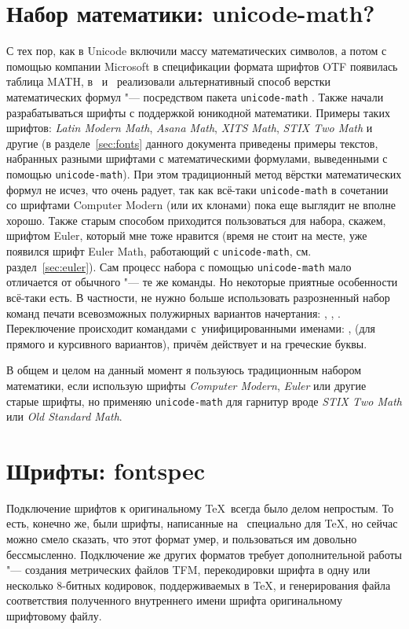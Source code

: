 \documentclass[a4paper,12pt,hyphens]{article}
\newcommand\package[1]{\texttt{#1}}
\newcommand\lcmd[1]{\texttt{#1}}
\begin{document}
\section{Набор математики: unicode-math?}
С тех пор, как в Unicode включили массу математических символов, а потом с
помощью компании Microsoft в спецификации формата шрифтов OTF
появилась таблица MATH, в \LuaLaTeX\ и \XeTeX\ реализовали альтернативный
способ верстки математических формул "--- посредством пакета
\package{unicode-math} \parencite{ctan-unicode-math}.
Также начали разрабатываться шрифты с поддержкой юникодной математики. Примеры таких
шрифтов: \emph{Latin Modern Math}, \emph{Asana Math}, \emph{XITS Math},
\emph{STIX Two Math} и другие (в разделе~\ref{sec:fonts} данного документа приведены
примеры текстов, набранных разными шрифтами с математическими формулами, выведенными
с помощью \package{unicode-math}).
При этом традиционный метод вёрстки математических формул не исчез, что
очень радует, так как всё-таки \package{unicode-math} в сочетании со шрифтами
Computer Modern (или их клонами) пока еще выглядит не вполне хорошо.
Также старым способом приходится пользоваться для набора, скажем, шрифтом
Euler, который мне тоже нравится (время не стоит на месте, уже появился шрифт Euler Math,
работающий с \package{unicode-math}, см. раздел~\ref{sec:euler}). Сам процесс набора с помощью \package{unicode-math}
мало отличается от обычного "--- те же команды. Но некоторые приятные особенности всё-таки
есть. В частности, не нужно больше использовать разрозненный набор команд
печати всевозможных полужирных вариантов начертания: \lcmd{\mathbf}, \lcmd{\boldkey},
\lcmd{\boldsymbol}. Переключение происходит командами с~унифицированными именами:
\lcmd{\symbfup}, \lcmd{\symbfit} (для прямого и курсивного вариантов), причём
действует и на греческие буквы.

В общем и целом на данный момент я пользуюсь традиционным набором математики,
если использую шрифты \emph{Computer Modern}, \emph{Euler} или другие старые шрифты, но
применяю \package{unicode-math} для гарнитур вроде \emph{STIX Two Math} или
\emph{Old Standard Math}.

\section{Шрифты: fontspec}
Подключение шрифтов к оригинальному \TeX\ всегда было делом непростым.
То есть, конечно же, были шрифты, написанные на \METAFONT\ специально для
\TeX, но сейчас можно смело сказать, что этот формат умер, и пользоваться
им довольно бессмысленно. Подключение же других форматов требует
дополнительной работы "--- создания метрических файлов TFM, перекодировки
шрифта в одну или несколько 8-битных кодировок, поддерживаемых в \TeX,
и генерирования файла соответствия полученного внутреннего имени шрифта
оригинальному шрифтовому файлу.
\end{document}
